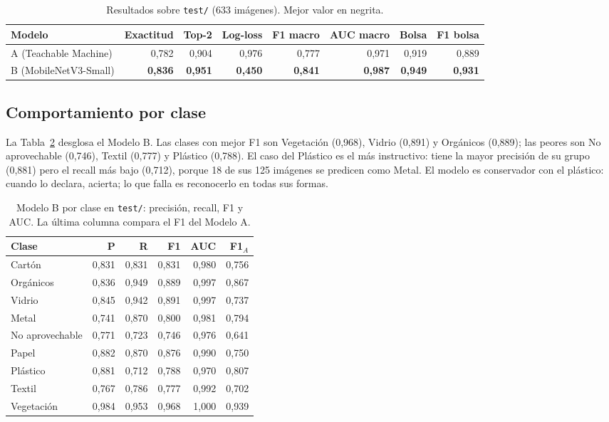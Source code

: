 \documentclass[10pt]{ieeeconf}
\begin{document}
\begin{table}[t]
\centering
\caption{Resultados sobre \texttt{test/} (633 im\'agenes). Mejor valor en negrita.}
\label{tab:global}
\footnotesize
\setlength{\tabcolsep}{6pt}
\begin{tabular}{@{}lrrrrrrr@{}}
\toprule
Modelo & Exactitud & Top-2 & Log-loss & F1 macro & AUC macro & Bolsa & F1 bolsa \\
\midrule
A (Teachable Machine) & 0,782 & 0,904 & 0,976 & 0,777 & 0,971 & 0,919 & 0,889 \\
B (MobileNetV3-Small) & \textbf{0,836} & \textbf{0,951} & \textbf{0,450} &
\textbf{0,841} & \textbf{0,987} & \textbf{0,949} & \textbf{0,931} \\
\bottomrule
\end{tabular}
\end{table}

\subsection{Comportamiento por clase}

La Tabla~\ref{tab:clases} desglosa el Modelo B. Las clases con mejor F1 son
Vegetaci\'on (0,968), Vidrio (0,891) y Org\'anicos (0,889); las peores son No
aprovechable (0,746), Textil (0,777) y Pl\'astico (0,788). El caso del Pl\'astico
es el m\'as instructivo: tiene la mayor precisi\'on de su grupo (0,881) pero el
recall m\'as bajo (0,712), porque 18 de sus 125 im\'agenes se predicen como
Metal. El modelo es conservador con el pl\'astico: cuando lo declara, acierta; lo
que falla es reconocerlo en todas sus formas.

\begin{table}[t]
\centering
\caption{Modelo B por clase en \texttt{test/}: precisi\'on, recall, F1 y AUC.
La \'ultima columna compara el F1 del Modelo A.}
\label{tab:clases}
\footnotesize
\setlength{\tabcolsep}{2.8pt}
\begin{tabular}{@{}lrrrrr@{}}
\toprule
Clase & P & R & F1 & AUC & F1$_A$ \\
\midrule
Cart\'on        & 0,831 & 0,831 & 0,831 & 0,980 & 0,756 \\
Org\'anicos     & 0,836 & 0,949 & 0,889 & 0,997 & 0,867 \\
Vidrio          & 0,845 & 0,942 & 0,891 & 0,997 & 0,737 \\
Metal           & 0,741 & 0,870 & 0,800 & 0,981 & 0,794 \\
No aprovechable & 0,771 & 0,723 & 0,746 & 0,976 & 0,641 \\
Papel           & 0,882 & 0,870 & 0,876 & 0,990 & 0,750 \\
Pl\'astico      & 0,881 & 0,712 & 0,788 & 0,970 & 0,807 \\
Textil          & 0,767 & 0,786 & 0,777 & 0,992 & 0,702 \\
Vegetaci\'on    & 0,984 & 0,953 & 0,968 & 1,000 & 0,939 \\
\bottomrule
\end{tabular}
\end{table}
\end{document}

